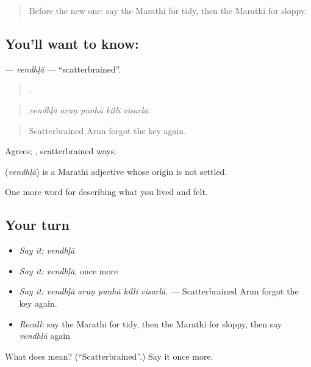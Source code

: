 \begin{quote}
Before the new one: say the Marathi for tidy, then the Marathi for sloppy.
\end{quote}

\subsection*{You'll want to know: }
\textbf{} — \emph{vendhḷā} — \textquotedblleft{}scatterbrained\textquotedblright{}.

\begin{quote}
    .
\end{quote}

\begin{quote}
\emph{vendhḷā aruṇ punhā killī visarlā.}
\end{quote}

\begin{quote}
Scatterbrained Arun forgot the key again.
\end{quote}

Agrees; , scatterbrained ways.

\begin{cousinweb}
\textbf{} (\emph{vendhḷā}) is a Marathi adjective whose origin is not settled.
\end{cousinweb}

\begin{grammarlens}[title={What you've built}]
One more word for describing what you lived and felt.
\end{grammarlens}

\subsection*{Your turn}
\begin{itemize}
\raggedright
  \item \emph{Say it:} \emph{vendhḷā}
  \item \emph{Say it:} \emph{vendhḷā}, once more
  \item \emph{Say it:} \emph{vendhḷā aruṇ punhā killī visarlā.} — Scatterbrained Arun forgot the key again.
  \item \emph{Recall:} say the Marathi for tidy, then the Marathi for sloppy, then say \emph{vendhḷā} again
\end{itemize}

\begin{tcolorbox}[breakable,colback=teal!4,colframe=teal!35!black,title={Before you move on}]
What does  mean? (\textquotedblleft{}Scatterbrained\textquotedblright{}.) Say it once more.
\end{tcolorbox}
